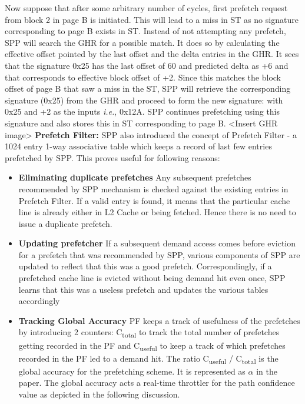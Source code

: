 \documentclass{sig-alternate}
\begin{document}
Now suppose that after some arbitrary number of cycles, first prefetch request from block 2 in page B is initiated. 
This will lead to a miss in ST as no signature corresponding to page B exists in ST. 
Instead of not attempting any prefetch, SPP will search the GHR for a possible match. 
It does so by calculating the effective offset pointed by the last offset and the delta entries in the GHR. 
It sees that the signature 0x25 has the last offset of 60 and predicted delta as +6 and that corresponds to effective block offset of +2. 
Since this matches the block offset of page B that saw a miss in the ST, SPP will retrieve the corresponding signature (0x25) from the GHR and proceed to form the new signature: with 0x25 and +2 as the inputs \textit{i.e.}, 0x12A. 
SPP continues prefetching using this signature and also stores this in ST corresponding to page B. <Insert GHR image>
\newline
\newline
\textbf{Prefetch Filter:} SPP also introduced the concept of Prefetch Filter - a 1024 entry 1-way associative table which keeps a record of last few entries prefetched by SPP. 
This proves useful for following reasons:
\begin{itemize}
    \item \textbf{Eliminating duplicate prefetches}\newline 
    Any subsequent prefetches recommended by SPP mechanism is checked against the existing entries in Prefetch Filter. 
If a valid entry is found, it means that the particular cache line is already either in L2 Cache or being fetched. 
Hence there is no need to issue a duplicate prefetch.
    
    \item \textbf{Updating prefetcher}\newline
    If a subsequent demand access comes before eviction for a prefetch that was recommended by SPP, various components of SPP are updated to reflect that this was a good prefetch. 
Correspondingly, if a prefetched cache line is evicted without being demand hit even once, SPP learns that this was a useless prefetch and updates the various tables accordingly
    
    \item \textbf{Tracking Global Accuracy}\newline
    PF keeps a track of usefulness of the prefetches by introducing 2 counters: C\textsubscript{total} to track the total number of prefetches getting recorded in the PF and C\textsubscript{useful} to keep a track of which prefetches recorded in the PF led to a demand hit. 
The ratio C\textsubscript{useful} / C\textsubscript{total} is the global accuracy for the prefetching scheme. 
It is represented as $\alpha$ in the paper. 
The global accuracy acts a real-time throttler for the path confidence value as depicted in the following discussion.
\end{itemize}
\end{document}

